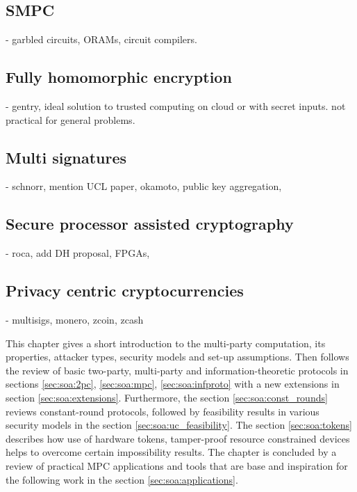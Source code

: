 \documentclass[
  digital, %
  twoside, %
  table,   %
  lof,     %
  lot,     %
]{fithesis3}
\theoremstyle{definition}
\theoremstyle{remark}
\begin{document}
\begin{ecmmnt}
    \subsection{SMPC}
    - garbled circuits, ORAMs, circuit compilers.
    
    \subsection{Fully homomorphic encryption}
    - gentry, ideal solution to trusted computing on cloud or with secret inputs. not practical for general problems.
    
    \subsection{Multi signatures}
    - schnorr, mention UCL paper, okamoto, public key aggregation,  
    
    \subsection{Secure processor assisted cryptography}
    - roca, add DH proposal, FPGAs, 
    
    \subsection{Privacy centric cryptocurrencies}
    - multisigs, monero, zcoin, zcash
\end{ecmmnt}
%

This chapter gives a short introduction to the multi-party computation, its properties, attacker types, security models and set-up assumptions. Then follows the review of basic two-party, multi-party and information-theoretic protocols in sections \ref{sec:soa:2pc}, \ref{sec:soa:mpc}, \ref{sec:soa:infproto} with a new extensions in section \ref{sec:soa:extensions}. Furthermore, the section \ref{sec:soa:const_rounds} reviews constant-round protocols, followed by feasibility results in various security models in the section \ref{sec:soa:uc_feasibility}. The section \ref{sec:soa:tokens} describes how use of hardware tokens, tamper-proof resource constrained devices helps to overcome certain impossibility results. The chapter is concluded by a review of practical MPC applications and tools that are base and inspiration for the following work in the section \ref{sec:soa:applications}.
\end{document}
